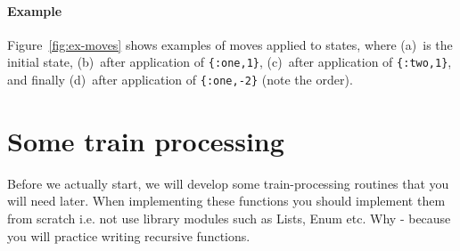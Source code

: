\documentclass[a4paper,11pt]{article}
\begin{document}
\paragraph{Example}

Figure~\ref{fig:ex-moves} shows examples of moves applied to
states, where (a)~is the initial state, (b)~after application of
\verb+{:one,1}+, (c)~after application of \verb+{:two,1}+, and finally
(d)~after application of \verb+{:one,-2}+ (note the order).

\section*{Some train processing}

Before we actually start, we will develop some train-processing
routines that you will need later. When implementing these functions
you should implement them from scratch i.e. not use library modules
such as Lists, Enum etc. Why - because you will practice writing
recursive functions.
\end{document}
